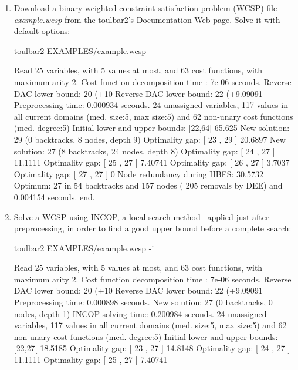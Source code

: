 \begin{enumerate}
\item Download a binary weighted constraint satisfaction problem (WCSP) file {\em example.wcsp} from the toulbar2's Documentation Web page. Solve it with default options:
\begin{DoxyCode}
	toulbar2 EXAMPLES/example.wcsp
\end{DoxyCode}
{\scriptsize
\begin{DoxyCode}
Read 25 variables, with 5 values at most, and 63 cost functions, with maximum arity 2.
Cost function decomposition time : 7e-06 seconds.
Reverse DAC lower bound: 20 (+10%
Reverse DAC lower bound: 22 (+9.09091%
Preprocessing time: 0.000934 seconds.
24 unassigned variables, 117 values in all current domains (med. size:5, max size:5) and 62 non-unary cost functions (med. degree:5)
Initial lower and upper bounds: [22,64[ 65.625%
New solution: 29 (0 backtracks, 8 nodes, depth 9)
Optimality gap: [ 23 , 29 ] 20.6897 %
New solution: 27 (8 backtracks, 24 nodes, depth 8)
Optimality gap: [ 24 , 27 ] 11.1111 %
Optimality gap: [ 25 , 27 ] 7.40741 %
Optimality gap: [ 26 , 27 ] 3.7037 %
Optimality gap: [ 27 , 27 ] 0 %
Node redundancy during HBFS: 30.5732 %
Optimum: 27 in 54 backtracks and 157 nodes ( 205 removals by DEE) and 0.004154 seconds.
end.
\end{DoxyCode}}
\item Solve a WCSP using INCOP, a local search method~\cite{idwalk:cp04} applied just after preprocessing, in order to find a good upper bound before a complete search:
\begin{DoxyCode}
	toulbar2 EXAMPLES/example.wcsp -i
\end{DoxyCode}
{\scriptsize
\begin{DoxyCode}
Read 25 variables, with 5 values at most, and 63 cost functions, with maximum arity 2.
Cost function decomposition time : 7e-06 seconds.
Reverse DAC lower bound: 20 (+10%
Reverse DAC lower bound: 22 (+9.09091%
Preprocessing time: 0.000898 seconds.
New solution: 27 (0 backtracks, 0 nodes, depth 1)
INCOP solving time: 0.200984 seconds.
24 unassigned variables, 117 values in all current domains (med. size:5, max size:5) and 62 non-unary cost functions (med. degree:5)
Initial lower and upper bounds: [22,27[ 18.5185%
Optimality gap: [ 23 , 27 ] 14.8148 %
Optimality gap: [ 24 , 27 ] 11.1111 %
Optimality gap: [ 25 , 27 ] 7.40741 %

\end{DoxyCode}}
\end{enumerate}
